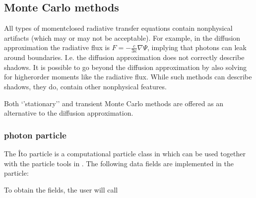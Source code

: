 \documentclass[letterpaper,10pt,english]{sphinxmanual}
\begin{document}
\subsection{Monte Carlo methods}
\label{\detokenize{Solvers/RTE:monte-carlo-methods}}\label{\detokenize{Solvers/RTE:chap-montecarlorte}}
\sphinxAtStartPar
All types of moment\sphinxhyphen{}closed radiative transfer equations contain nonphysical artifacts (which may or may not be acceptable).
For example, in the diffusion approximation the radiative flux is \(F = -\frac{c}{3\kappa}\nabla \Psi\), implying that photons can leak around boundaries.
I.e. the diffusion approximation does not correctly describe shadows.
It is possible to go beyond the diffusion approximation by also solving for higher\sphinxhyphen{}order moments like the radiative flux.
While such methods can describe shadows, they do, contain other nonphysical features.

\sphinxAtStartPar
Both ‘’stationary’’ and transient Monte Carlo methods are offered as an alternative to the diffusion approximation.


\subsubsection{photon particle}
\label{\detokenize{Solvers/RTE:photon-particle}}
\sphinxAtStartPar
The Îto particle is a computational particle class in  which can be used together with the particle tools in .
The following data fields are implemented in the particle:

\begin{sphinxVerbatim}[commandchars=\\\{\},formatcom=\scriptsize]
 
 
 
 
\end{sphinxVerbatim}

\sphinxAtStartPar
To obtain the fields, the user will call

\begin{sphinxVerbatim}[commandchars=\\\{\},formatcom=\scriptsize]
 
 
 
 
\end{sphinxVerbatim}
\end{document}
